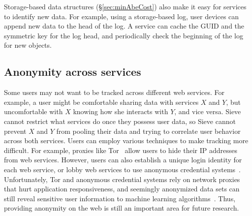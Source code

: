 Storage-based data structures (\S\ref{sec:minAbeCost})
also make it easy for services to identify new
data. For example, using a storage-based log,
user devices can append new data to the head of
the log. A service can cache the GUID and the
symmetric key for the log head, and periodically
check the beginning of the log for new objects.

\subsection{Anonymity across services} 
Some users may not want to be tracked across
different web services. For example, a user
might be comfortable sharing data with services
$X$ and $Y$, but uncomfortable with $X$ knowing
how she interacts with $Y$, and vice versa.
Sieve cannot restrict what services do once
they possess user data, so Sieve cannot prevent
$X$ and $Y$ from pooling their data and trying
to correlate user behavior across both services.
Users can employ various techniques to make
tracking more difficult. For example, proxies
like Tor~\cite{tor} allow users to hide their
IP addresses from web services. However, users can also
establish a unique login identity for each web
service, or lobby web services to use anonymous
credential systems~\cite{camenisch2001efficient}. 
Unfortunately, Tor and anonymous credential
systems rely on network proxies that hurt
application responsiveness, and seemingly
anonymized data sets can still reveal sensitive
user information to machine learning algorithms~\cite{dwork2011differential}.
Thus, providing anonymity on the web is still
an important area for future research.

